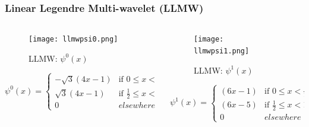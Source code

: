 \begin{frame}\frametitle{Linear Legendre Multi-wavelet (LLMW)}

    \begin{columns}[T]
      \begin{column}{.5\textwidth}
      
              \begin{figure}
              \centering
              \texttt{[image: llmwpsi0.png]}
              \caption{LLMW: $\psi^0(x)$}
              \label{fig_e_vs_n_f1}
              \end{figure}
              \vspace{-4 mm}

              \tiny{
              
              \begin{equation}
              \psi^0(x)=
              \left\{
                  \begin{array}{ll}
                      -\sqrt{3}(4x-1)  & \mbox{if } 0 \leq x < \frac{1}{2} \\
                      \sqrt{3}(4x-1)  & \mbox{if } \frac{1}{2} \leq x < 1 \\
                      0 & elsewhere
                  \end{array}
              \right.
              \nonumber
              \end{equation}}


      \end{column}
      \begin{column}{.5\textwidth}
              \begin{figure}
              \centering
              \texttt{[image: llmwpsi1.png]}
              \caption{LLMW: $\psi^1(x)$}
              \label{fig_e_vs_n_f2}
              \end{figure}

              \tiny{
                            \begin{equation}
                            \psi^1(x)=
                            \left\{
                                \begin{array}{ll}
                                    (6x-1)  & \mbox{if } 0 \leq x < \frac{1}{2} \\
                                    (6x-5)  & \mbox{if } \frac{1}{2} \leq x < 1 \\
                                    0 & elsewhere
                                \end{array}
                            \right.
                            \nonumber
                            \end{equation}}
        \end{column}
      \end{columns}
\end{frame}


